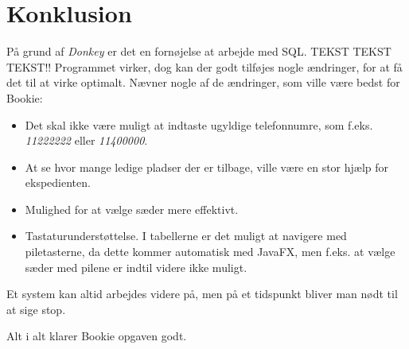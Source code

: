 \chapter{Konklusion}




På grund af \textit{Donkey} er det en fornøjelse at arbejde med SQL. TEKST TEKST TEKST!! 
Programmet virker, dog kan der godt tilføjes nogle ændringer, for at få det til at virke optimalt. Nævner nogle af de ændringer, som ville være bedst for Bookie:

\begin{itemize}
  \item Det skal ikke være muligt at indtaste ugyldige telefonnumre, som f.eks. \textit{
  11222222} eller \textit{11400000}.
  \item At se hvor mange ledige pladser der er tilbage, ville være en stor hjælp for ekspedienten.
  \item Mulighed for at vælge sæder mere effektivt.
  
  \item Tastaturunderstøttelse. I tabellerne er det muligt at navigere med piletasterne, da dette kommer automatisk med JavaFX, men f.eks. at vælge sæder med pilene er indtil videre ikke muligt.
  
\end{itemize}
Et system kan altid arbejdes videre på, men på et tidspunkt bliver man nødt til at sige stop.



Alt i alt klarer Bookie opgaven godt.